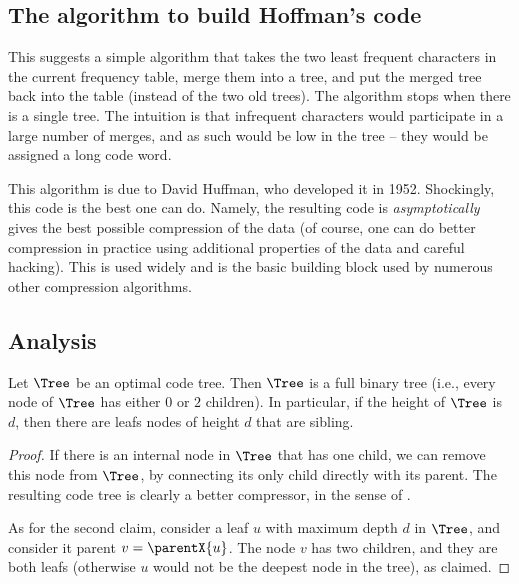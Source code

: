 \subsection{The algorithm to build Hoffman's code}

This suggests a simple algorithm that takes the two least frequent
characters in the current frequency table, merge them into a tree, and
put the merged tree back into the table (instead of the two old
trees). The algorithm stops when there is a single tree. The intuition
is that infrequent characters would participate in a large number of
merges, and as such would be low in the tree -- they would be assigned
a long code word. 

This algorithm is due to David Huffman, who developed it in
1952. Shockingly, this code is the best one can do. Namely, the
resulting code is \emph{asymptotically} gives the best possible
compression of the data (of course, one can do better compression in
practice using additional properties of the data and careful
hacking). This  is used widely and is the basic
building block used by numerous other compression algorithms.



\subsection{Analysis}

\begin{lemma}
    Let $\Tree$ be an optimal code tree. Then $\Tree$ is a full binary
    tree (i.e., every node of $\Tree$ has either $0$ or $2$ children).
    In particular, if the height of $\Tree$ is $d$, then there are
    leafs nodes of height $d$ that are sibling.
\end{lemma}

\begin{proof}
    If there is an internal node in $\Tree$ that has one child, we can
    remove this node from $\Tree$, by connecting its only child directly
    with its parent. The resulting code tree is clearly a better
    compressor, in the sense of .

    As for the second claim, consider a leaf $u$ with maximum depth
    $d$ in $\Tree$, and consider it parent $v = \parentX{u}$. The node
    $v$ has two children, and they are both leafs (otherwise $u$ would
    not be the deepest node in the tree), as claimed.
\end{proof}

